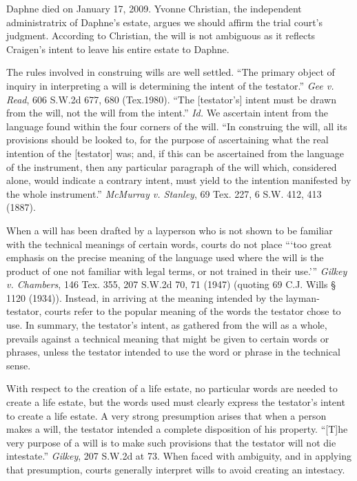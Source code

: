 Daphne died on January 17, 2009. Yvonne Christian, the independent
administratrix of Daphne's estate, argues we should affirm the trial court's
judgment. According to Christian, the will is not ambiguous as it reflects
Craigen's intent to leave his entire estate to Daphne.


The rules involved in construing wills are well settled. ``The primary object of
inquiry in interpreting a will is determining the intent of the testator.''
\textit{Gee v. Read}, 606 S.W.2d 677, 680 (Tex.1980). ``The [testator's] intent
must be drawn from the will, not the will from the intent.'' \textit{Id.} We
ascertain intent from the language found within the four corners of the will.
``In construing the will, all its provisions should be looked to, for the
purpose of ascertaining what the real intention of the [testator] was; and, if
this can be ascertained from the language of the instrument, then any
particular paragraph of the will which, considered alone, would indicate a
contrary intent, must yield to the intention manifested by the whole
instrument.'' \textit{McMurray v. Stanley}, 69 Tex. 227, 6 S.W. 412, 413
(1887). 

When a will has been drafted by a layperson who is not shown to be familiar with
the technical meanings of certain words, courts do not place ``{}`too great
emphasis on the precise meaning of the language used where the will is the
product of one not familiar with legal terms, or not trained in their use.'{}''
\textit{Gilkey v. Chambers}, 146 Tex. 355, 207 S.W.2d 70, 71 (1947) (quoting 69
C.J. Wills {\S} 1120 (1934)). Instead, in arriving at the meaning intended by
the layman-testator, courts refer to the popular meaning of the words the
testator chose to use. In summary, the testator's intent, as gathered from the
will as a whole, prevails against a technical meaning that might be given to
certain words or phrases, unless the testator intended to use the word or
phrase in the technical sense.

With respect to the creation of a life estate, no particular words are needed to
create a life estate, but the words used must clearly express the testator's
intent to create a life estate. A very strong presumption arises that when a
person makes a will, the testator intended a complete disposition of his
property. ``[T]he very purpose of a will is to make such provisions that the
testator will not die intestate.'' \textit{Gilkey}, 207 S.W.2d at 73. When
faced with ambiguity, and in applying that presumption, courts generally
interpret wills to avoid creating an intestacy. 

